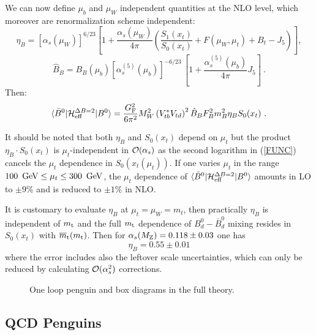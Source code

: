 \documentclass[12pt,rotate]{article}
\def\as{\alpha_s}
\newcommand{\mt}{m_{\rm t}}
\newcommand{\mtb}{\overline{m}_{\rm t}}
\newcommand{\mz}{M_{\rm Z}}
\newcommand{\gev}{\, {\rm GeV}}
\newcommand{\be}{\begin{equation}}
\newcommand{\ee}{\end{equation}}
\newcommand{\ord}{{\cal O}}
\begin{document}
\begin{itemize}
\begin{itemize}
We can now define $\mu_b$ and $\mu_W$ independent quantities at
the NLO level, which moreover are renormalization scheme independent:
\be\label{ETANLO}
\eta_B=\left[\as(\mu_W)\right]^{6/23}\left[1+
\frac{\as(\mu_W)}{4\pi} \left(
 \frac{S_1(x_t)}{S_0(x_t)}+F(\mu_W,\mu_t)
+B_t - J_5\right)\right],
\ee
\begin{equation}\label{Def-Bpar0}
\hat B_{B} = B_{B}(\mu_b) \left[ \as^{(5)}(\mu_b) \right]^{-6/23} \,
\left[ 1 + \frac{\as^{(5)}(\mu_b)}{4\pi} J_5 \right]~.
\end{equation}
Then:
\begin{equation}\label{mhdb4}
\langle \bar B^0|{\cal H}^{\Delta B=2}_{\rm eff}|B^0\rangle
=\frac{G^2_{\rm F}}{6\pi^2}M^2_W
 \left(V^\ast_{tb}V_{td}\right)^2 
 \hat B_B F^2_B m^2_B \eta_B S_0(x_t)~.
\end{equation}

It should be noted that both $\eta_B$ and $S_0(x_t)$ depend on
$\mu_t$ but the product
$\eta_B \cdot S_0(x_t)$ is $\mu_t$-independent in $\ord(\as)$
as the second logarithm in (\ref{FUNC}) cancels the
$\mu_t$ dependence in $S_0(x_t(\mu_t))$. If one varies $\mu_t$ in the
range $100~\gev\le\mu_t\le 300~\gev$, the $\mu_t$ dependence of
$\langle \bar B^0|{\cal H}^{\Delta B=2}_{\rm eff}|B^0\rangle$ amounts in
LO to $\pm 9\%$ and is reduced to $\pm 1\%$ in NLO.

It is customary to evaluate $\eta_B$ at  $\mu_t=\mu_W=m_t$, then
practically $\eta_B$ is independent of $\mt$ and the full $\mt$
dependence of $B^0_d-\bar B^0_d$ mixing resides in $S_0(x_t)$ with
$\mtb(\mt)$. Then for $\as(\mz)=0.118\pm0.03$ one has
\be\label{etab}
\eta_B=0.55\pm 0.01
\ee
where the error includes also the leftover scale uncertainties,
which can only be reduced by calculating $\ord(\as^2)$ corrections.

\begin{figure}[hbt]
\vspace{0.10in}
\centerline{
\epsfysize=1.5in
}%
\vspace{0.08in}
\caption[]{One loop penguin and box diagrams in the full theory.
\label{L:14}}
\end{figure}

\subsection{QCD Penguins}
         \label{sec:HeffdF1:66}

\end{itemize}
\end{itemize}
\end{document}
